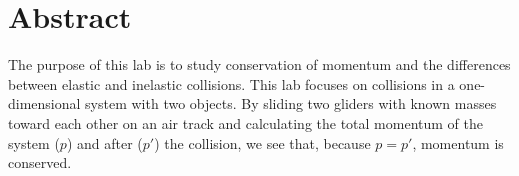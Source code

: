 \section*{Abstract}

\noindent
The purpose of this lab is to study conservation of momentum and the 
differences between elastic and inelastic collisions. This lab focuses on
collisions in a one-dimensional system with two objects. By sliding two
gliders with known masses toward each other on an air track and calculating
the total momentum of the system ($p$) and after ($p'$) the collision, we see
that, because $p = p'$, momentum is conserved.